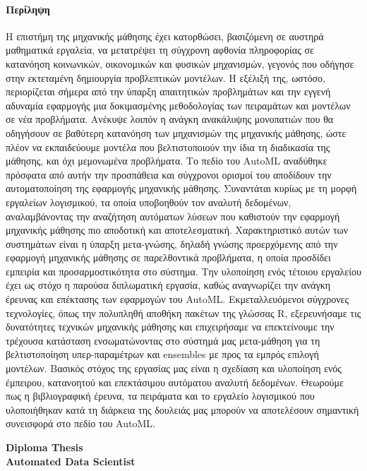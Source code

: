 {
	\titleformat{\paragraph}[display]{\normalfont\Large\bfseries\centering}{\theparagraph}{1em}{}
	\paragraph{Περίληψη}
	Η επιστήμη της μηχανικής μάθησης έχει κατορθώσει, βασιζόμενη σε αυστηρά μαθηματικά εργαλεία, να μετατρέψει τη σύγχρονη αφθονία πληροφορίας σε κατανόηση κοινωνικών, οικονομικών και φυσικών μηχανισμών, γεγονός που οδήγησε στην εκτεταμένη δημιουργία προβλεπτικών μοντέλων. Η εξέλιξή της, ωστόσο, περιορίζεται σήμερα από την ύπαρξη απαιτητικών προβλημάτων και την εγγενή αδυναμία εφαρμογής μια δοκιμασμένης μεθοδολογίας των πειραμάτων και μοντέλων σε νέα προβλήματα. Ανέκυψε λοιπόν η ανάγκη ανακάλυψης μονοπατιών που θα οδηγήσουν σε βαθύτερη κατανόηση των μηχανισμών της μηχανικής μάθησης, ώστε πλέον να εκπαιδεύουμε μοντέλα που βελτιστοποιούν την ίδια τη διαδικασία της μάθησης, και όχι μεμονωμένα προβλήματα. Το πεδίο του ΑutoML αναδύθηκε πρόσφατα από αυτήν την προσπάθεια και σύγχρονοι ορισμοί του αποδίδουν την αυτοματοποίηση της εφαρμογής μηχανικής μάθησης. Συναντάται κυρίως με τη μορφή εργαλείων λογισμικού, τα οποία υποβοηθούν τον αναλυτή δεδομένων, αναλαμβάνοντας την αναζήτηση αυτόματων λύσεων που καθιστούν την εφαρμογή μηχανικής μάθησης πιο αποδοτική και αποτελεσματική. Χαρακτηριστικό αυτών των συστημάτων είναι η ύπαρξη μετα-γνώσης, δηλαδή γνώσης προερχόμενης από την εφαρμογή μηχανικής μάθησης σε παρελθοντικά προβλήματα, η οποία προσδίδει εμπειρία και προσαρμοστικότητα στο σύστημα. Την υλοποίηση ενός τέτοιου εργαλείου έχει ως στόχο η παρούσα διπλωματική εργασία, καθώς αναγνωρίζει την ανάγκη έρευνας και επέκτασης των εφαρμογών του \gls{AutoML}. Εκμεταλλευόμενοι σύγχρονες τεχνολογίες, όπως την πολυπληθή αποθήκη πακέτων της γλώσσας R, εξερευνήσαμε τις δυνατότητες τεχνικών μηχανικής μάθησης και επιχειρήσαμε να επεκτείνουμε την τρέχουσα κατάσταση ενσωματώνοντας στο σύστημά μας μετα-μάθηση για τη βελτιστοποίηση υπερ-παραμέτρων και ensembles με προς τα εμπρός επιλογή μοντέλων. Βασικός στόχος της εργασίας μας είναι η σχεδίαση και υλοποίηση ενός έμπειρου, κατανοητού και επεκτάσιμου αυτόματου αναλυτή δεδομένων. Θεωρούμε πως η βιβλιογραφική έρευνα, τα πειράματα και το εργαλείο λογισμικού που υλοποιήθηκαν κατά τη διάρκεια της δουλειάς μας μπορούν να αποτελέσουν σημαντική συνεισφορά στο πεδίο του \gls{AutoML}. 
	\newpage
	\begin{center}
		\textbf{\huge{Diploma Thesis\\}}
		\vspace{0.5cm}
		\textbf{\Large{Automated Data Scientist}}
	\end{center}
	
}
